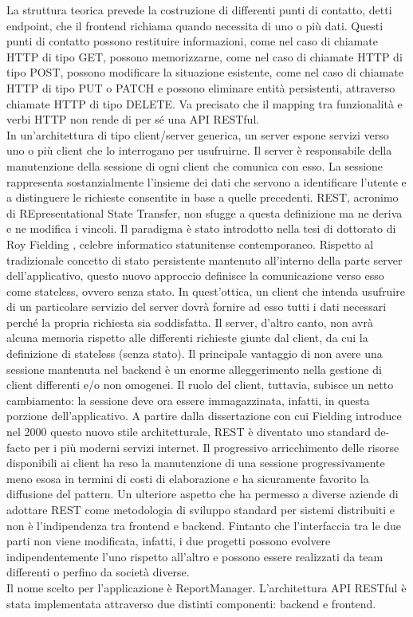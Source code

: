 La struttura teorica prevede la costruzione di differenti punti di contatto, detti endpoint, che il frontend richiama quando necessita di uno o più dati.
Questi punti di contatto possono restituire informazioni, come nel caso di chiamate HTTP di tipo GET, possono memorizzarne, come nel caso di chiamate HTTP di tipo POST, 
possono modificare la situazione esistente, come nel caso di chiamate HTTP di tipo PUT o PATCH e possono eliminare entità persistenti, attraverso chiamate HTTP di tipo DELETE.
Va precisato che il mapping tra funzionalità e verbi HTTP non rende di per sé una API RESTful.
\\
In un'architettura di tipo client/server generica, un server espone servizi verso uno o più client che lo interrogano per usufruirne.
Il server è responsabile della manutenzione della sessione di ogni client che comunica con esso.
La sessione rappresenta sostanzialmente l'insieme dei dati che servono a identificare l'utente e a distinguere le richieste consentite in base a quelle precedenti.
REST, acronimo di REpresentational State Transfer, non sfugge a questa definizione ma ne deriva e ne modifica i vincoli.
Il paradigma è stato introdotto nella tesi di dottorato di Roy Fielding \cite{fielding2000architectural}, celebre informatico statunitense contemporaneo.
Rispetto al tradizionale concetto di stato persistente mantenuto all'interno della parte server dell'applicativo, questo nuovo approccio definisce la comunicazione verso esso come 
stateless, ovvero senza stato.
In quest'ottica, un client che intenda usufruire di un particolare servizio del server dovrà fornire ad esso tutti i dati necessari perché la propria richiesta sia soddisfatta.
Il server, d'altro canto, non avrà alcuna memoria rispetto alle differenti richieste giunte dal client, da cui la definizione di stateless (senza stato).
Il principale vantaggio di non avere una sessione mantenuta nel backend è un enorme alleggerimento nella gestione di client differenti e/o non omogenei.
Il ruolo del client, tuttavia, subisce un netto cambiamento: la sessione deve ora essere immagazzinata, infatti, in questa porzione dell'applicativo.
A partire dalla dissertazione con cui Fielding introduce nel 2000 questo nuovo stile architetturale, REST è diventato uno standard de-facto per i più moderni servizi internet.
Il progressivo arricchimento delle risorse disponibili ai client ha reso la manutenzione di una sessione progressivamente meno esosa in termini di costi di elaborazione e ha 
sicuramente favorito la diffusione del pattern.
Un ulteriore aspetto che ha permesso a diverse aziende di adottare REST come metodologia di sviluppo standard per sistemi distribuiti e non è l'indipendenza tra frontend e backend.
Fintanto che l'interfaccia tra le due parti non viene modificata, infatti, i due progetti possono evolvere indipendentemente l'uno rispetto all'altro e possono essere realizzati 
da team differenti o perfino da società diverse.
\\
Il nome scelto per l'applicazione è ReportManager.
L'architettura API RESTful è stata implementata attraverso due distinti componenti: backend e frontend.

